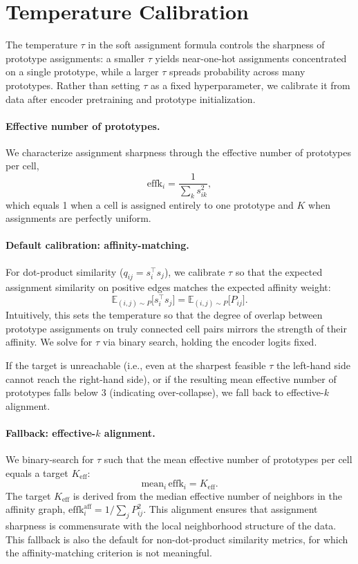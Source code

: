 \section{Temperature Calibration}
\label{app:calibration}

The temperature $\tau$ in the soft assignment formula controls the sharpness of prototype assignments: a smaller $\tau$ yields near-one-hot assignments concentrated on a single prototype, while a larger $\tau$ spreads probability across many prototypes. Rather than setting $\tau$ as a fixed hyperparameter, we calibrate it from data after encoder pretraining and prototype initialization.

\paragraph{Effective number of prototypes.}
We characterize assignment sharpness through the effective number of prototypes per cell,
\[
\mathrm{effk}_i = \frac{1}{\displaystyle\sum_{k} s_{ik}^2},
\]
which equals 1 when a cell is assigned entirely to one prototype and $K$ when assignments are perfectly uniform.

\paragraph{Default calibration: affinity-matching.}
For dot-product similarity ($q_{ij} = s_i^\top s_j$), we calibrate $\tau$ so that the expected assignment similarity on positive edges matches the expected affinity weight:
\[
\mathbb{E}_{(i,j) \sim P}\bigl[s_i^\top s_j\bigr] = \mathbb{E}_{(i,j) \sim P}\bigl[P_{ij}\bigr].
\]
Intuitively, this sets the temperature so that the degree of overlap between prototype assignments on truly connected cell pairs mirrors the strength of their affinity. We solve for $\tau$ via binary search, holding the encoder logits fixed.

If the target is unreachable (i.e., even at the sharpest feasible $\tau$ the left-hand side cannot reach the right-hand side), or if the resulting mean effective number of prototypes falls below 3 (indicating over-collapse), we fall back to effective-$k$ alignment.

\paragraph{Fallback: effective-$k$ alignment.}
We binary-search for $\tau$ such that the mean effective number of prototypes per cell equals a target $K_\mathrm{eff}$:
\[
\mathrm{mean}_i\,\mathrm{effk}_i = K_\mathrm{eff}.
\]
The target $K_\mathrm{eff}$ is derived from the median effective number of neighbors in the affinity graph, $\mathrm{effk}_i^{\mathrm{aff}} = 1/\sum_j P_{ij}^2$. This alignment ensures that assignment sharpness is commensurate with the local neighborhood structure of the data. This fallback is also the default for non-dot-product similarity metrics, for which the affinity-matching criterion is not meaningful.

